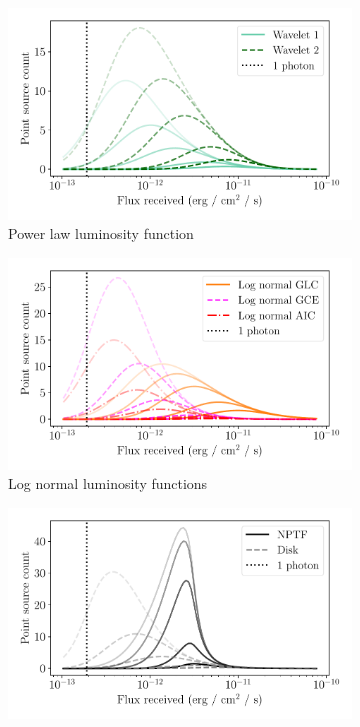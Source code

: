 \documentclass[letter,11pt]{article}
\begin{document}
\begin{figure}
    \centering
    \begin{subfigure}[b]{0.49\textwidth}
        \includegraphics[width=\textwidth]{figs/power-law-sensitivity-hist-smoothing.pdf}
        \caption{Power law luminosity function}
    \end{subfigure}
    \hfill
    \begin{subfigure}[b]{0.49\textwidth}
        \includegraphics[width=\textwidth]{figs/log-normal-sensitivity-hist-smoothing.pdf}
        \caption{Log normal luminosity functions }
    \end{subfigure}
    \hfill
    \begin{subfigure}[b]{0.49\textwidth}
        \includegraphics[width=\textwidth]{figs/nptf-sensitivity-hist-smoothing.pdf}

\end{subfigure}
\end{figure}
\end{document}
